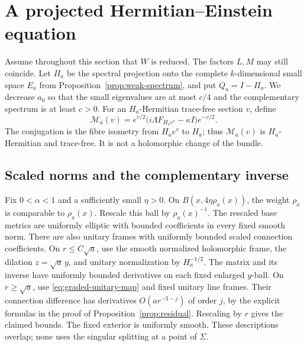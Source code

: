 \section{A projected Hermitian--Einstein equation}
\label{sec:projected-correction}

Assume throughout this section that \(W\) is reduced. The factors
\(L,M\) may still coincide. Let \(\Pi_a\) be the spectral projection
onto the complete \(k\)-dimensional small space \(E_a\) from
Proposition~\ref{prop:weak-spectrum}, and put \(Q_a=I-\Pi_a\).
We decrease \(a_0\) so that the small eigenvalues are at most \(c/4\)
and the complementary spectrum is at least \(c>0\).
For an \(H_a\)-Hermitian trace-free section \(v\), define
\begin{equation}\label{eq:centered-curvature}
 \mathcal M_a(v)=e^{v/2}
       \bigl(i\Lambda F_{H_ae^v}-\kappa I\bigr)e^{-v/2}.
\end{equation}
The conjugation is the fibre isometry from \(H_ae^v\) to \(H_a\);
thus \(\mathcal M_a(v)\) is \(H_a\)-Hermitian and trace-free.
It is not a holomorphic change of the bundle.

\subsection{Scaled norms and the complementary inverse}

Fix \(0<\alpha<1\) and a sufficiently small \(\eta>0\).
On \(B(x,4\eta\rho_a(x))\), the weight \(\rho_a\) is comparable
to \(\rho_a(x)\). Rescale this ball by \(\rho_a(x)^{-1}\).
The rescaled base metrics are uniformly elliptic with bounded
coefficients in every fixed smooth norm. There are also unitary
frames with uniformly bounded scaled connection coefficients.
On \(r\le C\sqrt a\), use the smooth normalized holomorphic
frame, the dilation \(z=\sqrt a\,y\), and unitary normalization
by \(H_a^{-1/2}\). The matrix and its inverse have uniformly
bounded derivatives on each fixed enlarged \(y\)-ball.
On \(r\ge\sqrt a\), use \eqref{eq:graded-unitary-map} and
fixed unitary line frames. Their connection difference has
derivatives \(O(a r^{-3-j})\) of order \(j\), by the explicit
formulas in the proof of Proposition~\ref{prop:residual}.
Rescaling by \(r\) gives the claimed bounds. The fixed exterior
is uniformly smooth. These descriptions overlap; none uses
the singular splitting at a point of \(\Sigma\).

